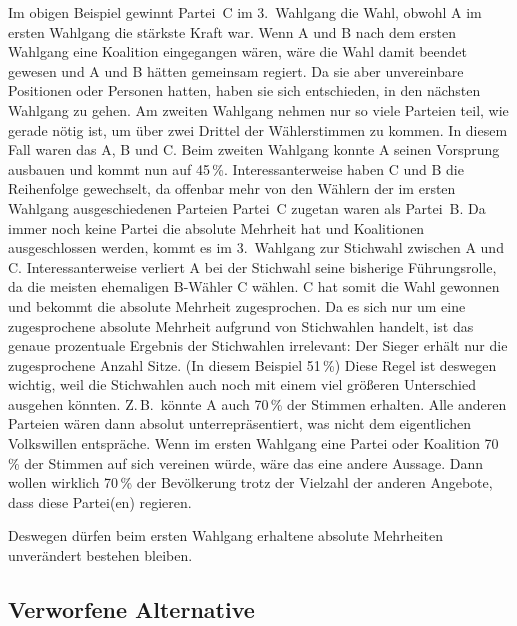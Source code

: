 \bigskip

Im obigen Beispiel gewinnt Partei~C im 3.~Wahlgang die Wahl, obwohl A im ersten Wahlgang die
stärkste Kraft war. Wenn A und B nach dem ersten Wahlgang eine Koalition eingegangen wären, wäre
die Wahl damit beendet gewesen und A und B hätten gemeinsam regiert. Da sie aber unvereinbare
Positionen oder Personen hatten, haben sie sich entschieden, in den nächsten Wahlgang zu gehen.
Am zweiten Wahlgang nehmen nur so viele Parteien teil, wie gerade nötig ist, um über zwei Drittel
der Wählerstimmen zu kommen. In diesem Fall waren das A, B und C. Beim zweiten Wahlgang konnte A
seinen Vorsprung ausbauen und kommt nun auf 45\,\%. Interessanterweise haben C und B die
Reihenfolge gewechselt, da offenbar mehr von den Wählern der im ersten Wahlgang ausgeschiedenen
Parteien Partei~C zugetan waren als Partei~B.
Da immer noch keine Partei die absolute Mehrheit hat und Koalitionen ausgeschlossen werden,
kommt es im 3.~Wahlgang zur Stichwahl zwischen A und C. Interessanterweise verliert A bei der
Stichwahl seine bisherige Führungsrolle, da die meisten ehemaligen B-Wähler C wählen. C hat
somit die Wahl gewonnen und bekommt die absolute Mehrheit zugesprochen. Da es sich nur um eine
zugesprochene absolute Mehrheit aufgrund von Stichwahlen handelt, ist das genaue prozentuale
Ergebnis der Stichwahlen irrelevant: Der Sieger erhält nur die zugesprochene Anzahl Sitze. (In
diesem Beispiel 51\,\%) Diese Regel ist deswegen wichtig, weil die Stichwahlen auch noch mit
einem viel größeren Unterschied ausgehen könnten. Z.\,B.\ könnte A auch 70\,\% der Stimmen
erhalten. Alle anderen Parteien wären dann absolut unterrepräsentiert, was nicht dem eigentlichen
Volkswillen entspräche. Wenn im ersten Wahlgang eine Partei oder Koalition 70\,\% der Stimmen auf
sich vereinen würde, wäre das eine andere Aussage. Dann wollen wirklich 70\,\% der Bevölkerung
trotz der Vielzahl der anderen Angebote, dass diese Partei(en) regieren.

Deswegen dürfen beim ersten Wahlgang erhaltene absolute Mehrheiten unverändert bestehen bleiben.

\subsection{Verworfene Alternative}

